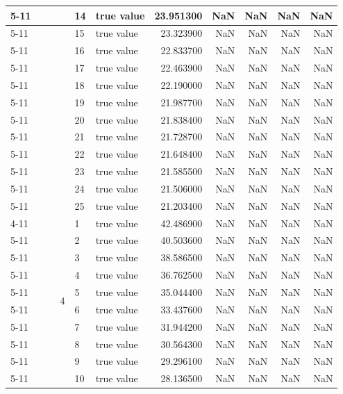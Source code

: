 \begin{tabular}{llllllrrrrr}
\cline{5-11}
 &  &  &  & 14 & true value & 23.951300 & NaN & NaN & NaN & NaN \\
\cline{5-11}
 &  &  &  & 15 & true value & 23.323900 & NaN & NaN & NaN & NaN \\
\cline{5-11}
 &  &  &  & 16 & true value & 22.833700 & NaN & NaN & NaN & NaN \\
\cline{5-11}
 &  &  &  & 17 & true value & 22.463900 & NaN & NaN & NaN & NaN \\
\cline{5-11}
 &  &  &  & 18 & true value & 22.190000 & NaN & NaN & NaN & NaN \\
\cline{5-11}
 &  &  &  & 19 & true value & 21.987700 & NaN & NaN & NaN & NaN \\
\cline{5-11}
 &  &  &  & 20 & true value & 21.838400 & NaN & NaN & NaN & NaN \\
\cline{5-11}
 &  &  &  & 21 & true value & 21.728700 & NaN & NaN & NaN & NaN \\
\cline{5-11}
 &  &  &  & 22 & true value & 21.648400 & NaN & NaN & NaN & NaN \\
\cline{5-11}
 &  &  &  & 23 & true value & 21.585500 & NaN & NaN & NaN & NaN \\
\cline{5-11}
 &  &  &  & 24 & true value & 21.506000 & NaN & NaN & NaN & NaN \\
\cline{5-11}
 &  &  &  & 25 & true value & 21.203400 & NaN & NaN & NaN & NaN \\
\cline{4-11} \cline{5-11}
 &  &  & \multirow[t]{25}{*}{4} & 1 & true value & 42.486900 & NaN & NaN & NaN & NaN \\
\cline{5-11}
 &  &  &  & 2 & true value & 40.503600 & NaN & NaN & NaN & NaN \\
\cline{5-11}
 &  &  &  & 3 & true value & 38.586500 & NaN & NaN & NaN & NaN \\
\cline{5-11}
 &  &  &  & 4 & true value & 36.762500 & NaN & NaN & NaN & NaN \\
\cline{5-11}
 &  &  &  & 5 & true value & 35.044400 & NaN & NaN & NaN & NaN \\
\cline{5-11}
 &  &  &  & 6 & true value & 33.437600 & NaN & NaN & NaN & NaN \\
\cline{5-11}
 &  &  &  & 7 & true value & 31.944200 & NaN & NaN & NaN & NaN \\
\cline{5-11}
 &  &  &  & 8 & true value & 30.564300 & NaN & NaN & NaN & NaN \\
\cline{5-11}
 &  &  &  & 9 & true value & 29.296100 & NaN & NaN & NaN & NaN \\
\cline{5-11}
 &  &  &  & 10 & true value & 28.136500 & NaN & NaN & NaN & NaN \\

\end{tabular}
